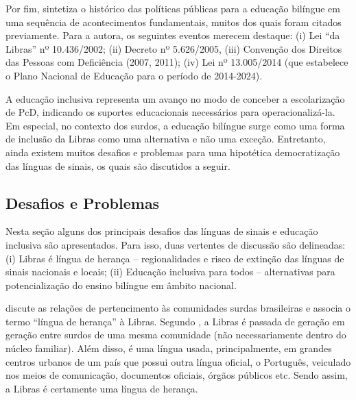 Por fim,  sintetiza o histórico das políticas públicas para a educação bilíngue em uma sequência de acontecimentos fundamentais, muitos dos quais foram citados previamente. Para a autora, os seguintes eventos merecem destaque: (i) Lei ``da Libras'' nº 10.436/2002; (ii) Decreto nº 5.626/2005, (iii) Convenção dos Direitos das Pessoas com Deficiência (2007, 2011); (iv) Lei nº 13.005/2014 (que estabelece o Plano Nacional de Educação para o período de 2014-2024).


A educação inclusiva representa um avanço no modo de conceber a escolarização de PcD, indicando os suportes educacionais necessários para operacionalizá-la. Em especial, no contexto dos surdos, a educação bilíngue surge como uma forma de inclusão da Libras como uma alternativa e não uma exceção. Entretanto, ainda existem muitos desafios e problemas para uma hipotética democratização das línguas de sinais, os quais são discutidos a seguir.

\subsection{Desafios e Problemas}
\label{fundamentacao-teorica:linguas-sinais:desafios}

Nesta seção alguns dos principais desafios das línguas de sinais e educação inclusiva são apresentados. Para isso, duas vertentes de discussão são delineadas: (i) Libras é língua de herança -- regionalidades e risco de extinção das línguas de sinais nacionais e locais; (ii) Educação inclusiva para todos -- alternativas para potencialização do ensino bilíngue em âmbito nacional. 

 discute as relações de pertencimento às comunidades surdas brasileiras e associa o termo ``língua de herança'' à Libras. Segundo , a Libras é passada de geração em geração entre surdos de uma mesma comunidade (não necessariamente dentro do núcleo familiar). Além disso, é uma língua usada, principalmente, em grandes centros urbanos de um país que possui outra língua oficial, o Português, veiculado nos meios de comunicação, documentos oficiais, órgãos públicos etc. Sendo assim, a Libras é certamente uma língua de herança.

